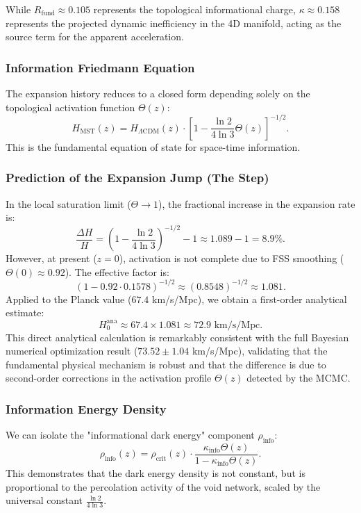 \documentclass[11pt, a4paper]{article}
\theoremstyle{plain}
\theoremstyle{definition}
\begin{document}
While $R_{\text{fund}} \approx 0.105$ represents the topological informational charge, $\kappa \approx 0.158$ represents the projected dynamic inefficiency in the 4D manifold, acting as the source term for the apparent acceleration.

\subsubsection{Information Friedmann Equation}
The expansion history reduces to a closed form depending solely on the topological activation function $\Theta(z)$:
\begin{equation}
H_{\text{MST}}(z) = H_{\Lambda\text{CDM}}(z) \cdot \left[ 1 - \frac{\ln 2}{4\ln 3} \Theta(z) \right]^{-1/2}.
\end{equation}
This is the fundamental equation of state for space-time information.

\subsubsection{Prediction of the Expansion Jump (The Step)}
In the local saturation limit ($\Theta \to 1$), the fractional increase in the expansion rate is:
\begin{equation}
\frac{\Delta H}{H} = \left( 1 - \frac{\ln 2}{4\ln 3} \right)^{-1/2} - 1 \approx 1.089 - 1 = 8.9\%.
\end{equation}
However, at present ($z=0$), activation is not complete due to FSS smoothing ($\Theta(0) \approx 0.92$). The effective factor is:
\begin{equation}
\left( 1 - 0.92 \cdot 0.1578 \right)^{-1/2} \approx (0.8548)^{-1/2} \approx 1.081.
\end{equation}
Applied to the Planck value ($67.4$ km/s/Mpc), we obtain a first-order analytical estimate:
\begin{equation}
H_0^{\text{ana}} \approx 67.4 \times 1.081 \approx 72.9 \text{ km/s/Mpc}.
\end{equation}
This direct analytical calculation is remarkably consistent with the full Bayesian numerical optimization result ($73.52 \pm 1.04$ km/s/Mpc), validating that the fundamental physical mechanism is robust and that the difference is due to second-order corrections in the activation profile $\Theta(z)$ detected by the MCMC.

\subsubsection{Information Energy Density}
We can isolate the "informational dark energy" component $\rho_{\text{info}}$:
\begin{equation}
\rho_{\text{info}}(z) = \rho_{\text{crit}}(z) \cdot \frac{\kappa_{\text{info}} \Theta(z)}{1 - \kappa_{\text{info}} \Theta(z)}.
\end{equation}
This demonstrates that the dark energy density is not constant, but is proportional to the percolation activity of the void network, scaled by the universal constant $\frac{\ln 2}{4\ln 3}$.
\end{document}
